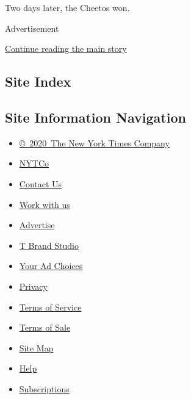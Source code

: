 Two days later, the Cheetos won.

Advertisement

\protect\hyperlink{after-bottom}{Continue reading the main story}

\hypertarget{site-index}{%
\subsection{Site Index}\label{site-index}}

\hypertarget{site-information-navigation}{%
\subsection{Site Information
Navigation}\label{site-information-navigation}}

\begin{itemize}
\tightlist
\item
  \href{https://help.nytimes3xbfgragh.onion/hc/en-us/articles/115014792127-Copyright-notice}{©~2020~The
  New York Times Company}
\end{itemize}

\begin{itemize}
\tightlist
\item
  \href{https://www.nytco.com/}{NYTCo}
\item
  \href{https://help.nytimes3xbfgragh.onion/hc/en-us/articles/115015385887-Contact-Us}{Contact
  Us}
\item
  \href{https://www.nytco.com/careers/}{Work with us}
\item
  \href{https://nytmediakit.com/}{Advertise}
\item
  \href{http://www.tbrandstudio.com/}{T Brand Studio}
\item
  \href{https://www.nytimes3xbfgragh.onion/privacy/cookie-policy\#how-do-i-manage-trackers}{Your
  Ad Choices}
\item
  \href{https://www.nytimes3xbfgragh.onion/privacy}{Privacy}
\item
  \href{https://help.nytimes3xbfgragh.onion/hc/en-us/articles/115014893428-Terms-of-service}{Terms
  of Service}
\item
  \href{https://help.nytimes3xbfgragh.onion/hc/en-us/articles/115014893968-Terms-of-sale}{Terms
  of Sale}
\item
  \href{https://spiderbites.nytimes3xbfgragh.onion}{Site Map}
\item
  \href{https://help.nytimes3xbfgragh.onion/hc/en-us}{Help}
\item
  \href{https://www.nytimes3xbfgragh.onion/subscription?campaignId=37WXW}{Subscriptions}
\end{itemize}
